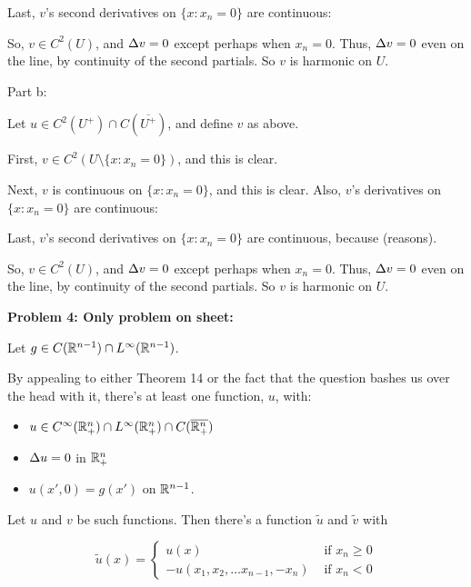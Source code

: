 \documentclass[a4paper,12pt]{article}
\begin{document}
Last, $v$'s second derivatives on $\{x: x_n = 0\}$ are continuous: %

So, $v \in C^2(U)$, and $\Delta v = 0$ except perhaps when $x_n = 0$. Thus, $\Delta v = 0$ even on the line, by continuity of the second partials. So $v$ is harmonic on $U$.

\shunt

Part b:

Let $u \in C^2(U^+) \cap C(\overline{U^+})$, and define $v$ as above.

First, $v \in C^2( U \setminus \{x: x_n = 0\})$, and this is clear.

Next, $v$ is continuous on $\{x: x_n = 0\}$, and this is clear. Also, $v$'s derivatives on $\{x: x_n = 0\}$ are continuous: %

Last, $v$'s second derivatives on $\{x: x_n = 0\}$ are continuous, because (reasons). %

So, $v \in C^2(U)$, and $\Delta v = 0$ except perhaps when $x_n = 0$. Thus, $\Delta v = 0$ even on the line, by continuity of the second partials. So $v$ is harmonic on $U$.

\shunt

{\bf Problem 4: Only problem on sheet:}

Let $g \in C(\mathbb{R}^{n-1}) \cap L^\infty (\mathbb{R}^{n-1})$.

By appealing to either Theorem 14 or the fact that the question bashes us over the head with it, there's at least one function, $u$, with:

\begin{itemize}
\item $u \in C^\infty( \mathbb{R}^n_+) \cap L^\infty  (\mathbb{R}^n_+) \cap C(\overline{\mathbb{R}^n_+})$
\item $\Delta u = 0$ in $\mathbb{R}^n_+$
\item $u(x',0) = g(x')$ on $\mathbb{R}^{n-1}$.
\end{itemize}

Let $u$ and $v$ be such functions. Then there's a function $\tilde{u}$ and $\tilde{v}$ with

\begin{displaymath}
\tilde{u}(x) =
   \left\{
     \begin{array}{lr}
       u(x) & \text{ if } x_n \geq 0\\
       -u(x_1,x_2, \ldots x_{n-1}, -x_n) & \text{ if } x_n < 0
     \end{array}
   \right.
\end{displaymath}
\end{document}
